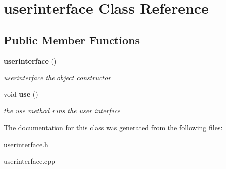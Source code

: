 \section{userinterface Class Reference}
\label{classuserinterface}
\subsection*{Public Member Functions}
\begin{DoxyCompactItemize}
\item 
{\bf userinterface} ()\label{classuserinterface_ae508a6a57646193b154ffedb47c4ab75}

\begin{DoxyCompactList}\small\item\em userinterface the object constructor \end{DoxyCompactList}\item 
void {\bf use} ()\label{classuserinterface_a3a79e1b650ea9d0553a9dcc6567522e5}

\begin{DoxyCompactList}\small\item\em the use method runs the user interface \end{DoxyCompactList}\end{DoxyCompactItemize}


The documentation for this class was generated from the following files\+:\begin{DoxyCompactItemize}
\item 
userinterface.\+h\item 
userinterface.\+cpp\end{DoxyCompactItemize}
